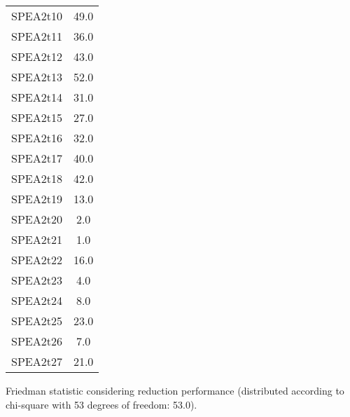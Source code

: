 \documentclass{article}
\begin{document}
\begin{table}[!htp]
\begin{tabular}{c|c}
SPEA2t10&49.0\\
SPEA2t11&36.0\\
SPEA2t12&43.0\\
SPEA2t13&52.0\\
SPEA2t14&31.0\\
SPEA2t15&27.0\\
SPEA2t16&32.0\\
SPEA2t17&40.0\\
SPEA2t18&42.0\\
SPEA2t19&13.0\\
SPEA2t20&2.0\\
SPEA2t21&1.0\\
SPEA2t22&16.0\\
SPEA2t23&4.0\\
SPEA2t24&8.0\\
SPEA2t25&23.0\\
SPEA2t26&7.0\\
SPEA2t27&21.0\\
\end{tabular}
\end{table}


Friedman statistic considering reduction performance (distributed according to chi-square with 53 degrees of freedom: 53.0).
\end{document}
